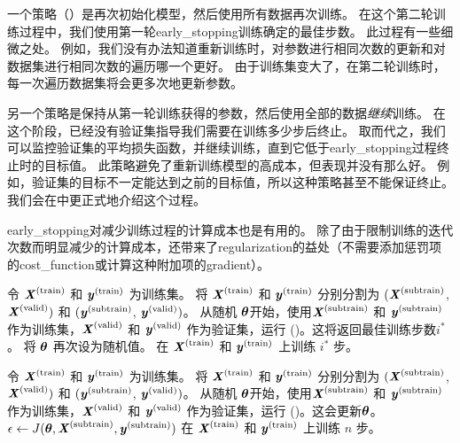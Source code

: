 
一个策略（）是再次初始化模型，然后使用所有数据再次训练。
在这个第二轮训练过程中，我们使用第一轮\gls{early_stopping}训练确定的最佳步数。
此过程有一些细微之处。
例如，我们没有办法知道重新训练时，对参数进行相同次数的更新和对数据集进行相同次数的遍历哪一个更好。
由于训练集变大了，在第二轮训练时，每一次遍历数据集将会更多次地更新参数。

另一个策略是保持从第一轮训练获得的参数，然后使用全部的数据\emph{继续}训练。
在这个阶段，已经没有验证集指导我们需要在训练多少步后终止。
取而代之，我们可以监控验证集的平均损失函数，并继续训练，直到它低于\gls{early_stopping}过程终止时的目标值。
此策略避免了重新训练模型的高成本，但表现并没有那么好。
例如，验证集的目标不一定能达到之前的目标值，所以这种策略甚至不能保证终止。
我们会在中更正式地介绍这个过程。

\gls{early_stopping}对减少训练过程的计算成本也是有用的。
除了由于限制训练的迭代次数而明显减少的计算成本，还带来了\gls{regularization}的益处（不需要添加惩罚项的\gls{cost_function}或计算这种附加项的\gls{gradient}）。

\begin{algorithm}[ht]
\caption{使用\gls{early_stopping}确定训练步数，然后在所有数据上训练的元算法。
}
\label{alg:early_stopping_retrain}
\begin{algorithmic}
\STATE 令 $\boldsymbol{\mathit{X}}^{(\text{train})}$ 和 $\boldsymbol{\mathit{y}}^{(\text{train})}$ 为训练集。
\STATE 将 $\boldsymbol{\mathit{X}}^{(\text{train})}$ 和 $\boldsymbol{\mathit{y}}^{(\text{train})}$ 分别分割为 $(\boldsymbol{\mathit{X}}^{(\text{subtrain})}$, $\boldsymbol{\mathit{X}}^{(\text{valid})})$ 和 $(\boldsymbol{\mathit{y}}^{(\text{subtrain})}$, $\boldsymbol{\mathit{y}}^{(\text{valid})})$。
\STATE 从随机 $\boldsymbol{\theta}$开始，使用$\boldsymbol{\mathit{X}}^{(\text{subtrain})}$ 和 $\boldsymbol{\mathit{y}}^{(\text{subtrain})}$作为训练集，$\boldsymbol{\mathit{X}}^{(\text{valid})}$ 和 $\boldsymbol{\mathit{y}}^{(\text{valid})}$ 作为验证集，运行 ()。这将返回最佳训练步数$i^*$。
\STATE 将 $\boldsymbol{\theta}$ 再次设为随机值。
\STATE 在 $\boldsymbol{\mathit{X}}^{(\text{train})}$ 和 $\boldsymbol{\mathit{y}}^{(\text{train})}$ 上训练 $i^*$ 步。  
\end{algorithmic}
\end{algorithm}

\begin{algorithm}[ht]
\caption{
使用\gls{early_stopping}确定将会\gls{overfitting}的目标值，然后在所有数据上训练直到再次
达到该值的元算法。
}
\label{alg:early_stopping_continue}
\begin{algorithmic}
\STATE 令 $\boldsymbol{\mathit{X}}^{(\text{train})}$ 和 $\boldsymbol{\mathit{y}}^{(\text{train})}$ 为训练集。
\STATE 将 $\boldsymbol{\mathit{X}}^{(\text{train})}$ 和 $\boldsymbol{\mathit{y}}^{(\text{train})}$ 分别分割为 $(\boldsymbol{\mathit{X}}^{(\text{subtrain})}$, $\boldsymbol{\mathit{X}}^{(\text{valid})})$ 和 $(\boldsymbol{\mathit{y}}^{(\text{subtrain})}$, $\boldsymbol{\mathit{y}}^{(\text{valid})})$。
\STATE 从随机 $\boldsymbol{\theta}$开始，使用$\boldsymbol{\mathit{X}}^{(\text{subtrain})}$ 和 $\boldsymbol{\mathit{y}}^{(\text{subtrain})}$作为训练集，$\boldsymbol{\mathit{X}}^{(\text{valid})}$ 和 $\boldsymbol{\mathit{y}}^{(\text{valid})}$ 作为验证集，运行 ()。这会更新$\boldsymbol{\theta}$。
\STATE $\epsilon \leftarrow J(\boldsymbol{\theta}, \boldsymbol{\mathit{X}}^{(\text{subtrain})},\boldsymbol{\mathit{y}}^{(\text{subtrain})})$
\STATE 在 $\boldsymbol{\mathit{X}}^{(\text{train})}$ 和 $\boldsymbol{\mathit{y}}^{(\text{train})}$ 上训练 $n$ 步。  
\ENDWHILE
\end{algorithmic}
\end{algorithm}



